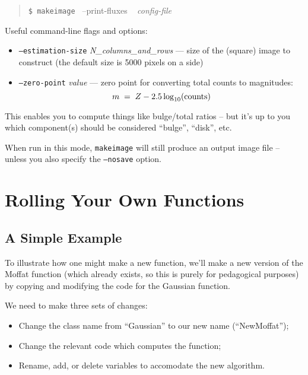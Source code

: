 \documentclass[10pt]{article}
\newcommand{\makeimage}{\texttt{makeimage}}
\begin{document}
\begin{quote}
  \texttt{\$ \makeimage{} }  --print-fluxes ~ \textit{config-file}
\end{quote}

Useful command-line flags and options:
\begin{itemize}

\item \texttt{--estimation-size} \textit{N\_columns\_and\_rows} --- size of the
(square) image to construct (the default size is 5000 pixels on a side)

\item \texttt{--zero-point} \textit{value} --- zero point for converting total counts
to magnitudes:
\begin{equation}
m \; = \; Z - 2.5 \log_{10}( {\rm counts} )
\end{equation}

\end{itemize}

This enables you to compute things like bulge/total ratios -- but it's up to you
which component(s) should be considered ``bulge'', ``disk'', etc.

When run in this mode, \makeimage{} will still produce an output image file --
unless you also specify the \texttt{--nosave} option.




\section{Rolling Your Own Functions}

\subsection{A Simple Example}

To illustrate how one might make a new function, we'll make a new version of
the Moffat function (which already exists, so this is purely for pedagogical purposes)
by copying and modifying the code for the Gaussian function.

\bigskip

We need to make three sets of changes:
\begin{itemize}
\item Change the class name from ``Gaussian'' to our new name (``NewMoffat'');
\item Change the relevant code which computes the function;
\item Rename, add, or delete variables to accomodate the new algorithm.
\end{itemize}
\end{document}
